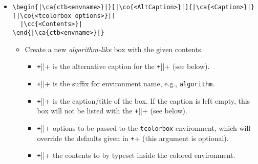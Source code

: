 \documentclass{article}
\begin{document}
\begin{itemize}
 \item \begin{verbatim}
\begin{|\ca{ctb<envname>}|}[|\co{<AltCaption>}|]{|\ca{<Caption>}|}[|\co{<tcolorbox options>}|]
  |\cc{<Contents>}|
\end{|\ca{ctb<envname>}|}
\end{verbatim}
  \begin{itemize}
    \item Create a new \emph{algorithm-like} box with the given contents.
    \begin{itemize}
      \item \texttt+||+ is the alternative
            caption for the
            \texttt+\cthlistof||+
            (see below).
      \item \texttt+||+ is the suffix for environment name,
            e.g., \verb+algorithm+.
      \item \texttt+||+ is the caption/title of
            the box.  If the caption is left empty, this box will not be listed with the
            \texttt+\cthlistof||+
            (see below).
      \item \texttt+||+ options to be
            passed to the \verb+tcolorbox+ environment, which will override the defaults
            given in \texttt+\cthnewalgorithm+  (this argument is optional).
      \item \texttt+||+ the contents to by typeset inside the colored environment.
    \end{itemize}
  \end{itemize}


\end{itemize}
\end{document}
